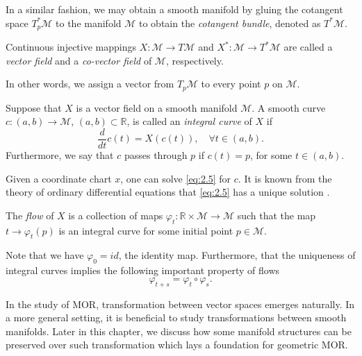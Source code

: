 In a similar fashion, we may obtain a smooth manifold by gluing the cotangent space $T^*_p \mathcal M$ to the manifold $\mathcal M$ to obtain the \emph{cotangent bundle}, denoted as $T^* \mathcal M$. 

\begin{definition}
Continuous injective mappings $X:\mathcal M \to T \mathcal M$ and $X^*:\mathcal M \to T^* \mathcal M$ are called a \emph{vector field} and a \emph{co-vector field} of $\mathcal M$, respectively.
\end{definition}
In other words, we assign a vector from $T_p\mathcal M$ to every point $p$ on $\mathcal M$.

\begin{definition}
Suppose that $X$ is a vector field on a smooth manifold $\mathcal M$. A smooth curve $c:(a,b)\to \mathcal M$, $(a,b)\subset \mathbb R$, is called an \emph{integral curve} of $X$ if
\begin{equation} \label{eq:2.5}
	\frac{d}{dt}c(t) = X(c(t)), \quad \forall t\in(a,b).
\end{equation}
Furthermore, we say that $c$ passes through $p$ if $c(t) = p$, for some $t\in(a,b)$.
\end{definition}
Given a coordinate chart $x$, one can solve \cref{eq:2.5} for $c$. It is known from the theory of ordinary differential equations that \cref{eq:2.5} has a unique solution \cite{teschl2012ordinary}. 
\begin{definition}
	The \emph{flow} of $X$ is a collection of maps $\varphi_t : \mathbb R \times \mathcal M \to \mathcal M$ such that the map $t \to \varphi_t(p)$ is an integral curve for some initial point $p\in \mathcal M$.
\end{definition}
Note that we have $\varphi_0 = id$, the identity map. Furthermore, that the uniqueness of integral curves implies the following important property of flows
\begin{equation} \label{eq:2.51}
	\varphi_{t+s} = \varphi_t \circ \varphi_s.
\end{equation}

In the study of MOR, transformation between vector spaces emerges naturally. In a more general setting, it is beneficial to study transformations between smooth manifolds. Later in this chapter, we discuss how some manifold structures can be preserved over such transformation which lays a foundation for geometric MOR.

